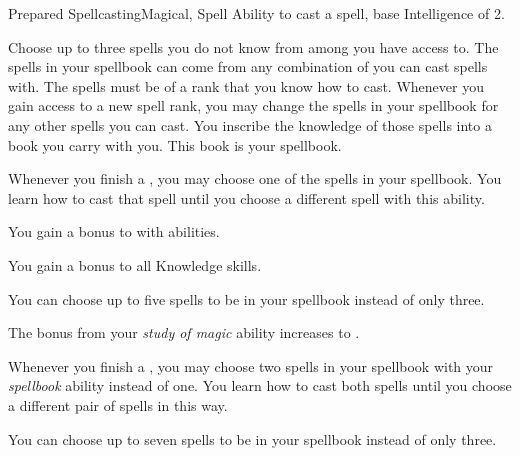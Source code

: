     \begin{feat}{Prepared Spellcasting}{Magical, Spell}
        \featpre Ability to cast a spell, base Intelligence of 2.

         Choose up to three spells you do not know from among  you have access to.
        The spells in your spellbook can come from any combination of  you can cast spells with.
        The spells must be of a rank that you know how to cast.
        Whenever you gain access to a new spell rank, you may change the spells in your spellbook for any other spells you can cast.
        You inscribe the knowledge of those spells into a book you carry with you.
        This book is your spellbook.
        
        Whenever you finish a , you may choose one of the spells in your spellbook.
        You learn how to cast that spell until you choose a different spell with this ability.

         You gain a  bonus to  with  abilities.

         You gain a  bonus to all Knowledge skills.

         You can choose up to five spells to be in your spellbook instead of only three.

         The bonus from your \textit{study of magic} ability increases to .

         Whenever you finish a , you may choose two spells in your spellbook with your \textit{spellbook} ability instead of one.
        You learn how to cast both spells until you choose a different pair of spells in this way.

         You can choose up to seven spells to be in your spellbook instead of only three.
    \end{feat}

